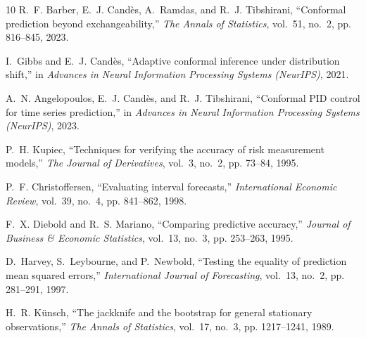 \documentclass[conference]{IEEEtran}
\begin{document}
\begin{thebibliography}{10}
R.~F. Barber, E.~J. Cand{\`e}s, A.~Ramdas, and R.~J. Tibshirani, ``Conformal
  prediction beyond exchangeability,'' \emph{The Annals of Statistics},
  vol.~51, no.~2, pp. 816--845, 2023.

I.~Gibbs and E.~J. Cand{\`e}s, ``Adaptive conformal inference under
  distribution shift,'' in \emph{Advances in Neural Information Processing
  Systems (NeurIPS)}, 2021.

A.~N. Angelopoulos, E.~J. Cand{\`e}s, and R.~J. Tibshirani, ``Conformal {PID}
  control for time series prediction,'' in \emph{Advances in Neural Information
  Processing Systems (NeurIPS)}, 2023.

P.~H. Kupiec, ``Techniques for verifying the accuracy of risk measurement
  models,'' \emph{The Journal of Derivatives}, vol.~3, no.~2, pp. 73--84, 1995.

P.~F. Christoffersen, ``Evaluating interval forecasts,'' \emph{International
  Economic Review}, vol.~39, no.~4, pp. 841--862, 1998.

F.~X. Diebold and R.~S. Mariano, ``Comparing predictive accuracy,''
  \emph{Journal of Business \& Economic Statistics}, vol.~13, no.~3, pp.
  253--263, 1995.

D.~Harvey, S.~Leybourne, and P.~Newbold, ``Testing the equality of prediction
  mean squared errors,'' \emph{International Journal of Forecasting}, vol.~13,
  no.~2, pp. 281--291, 1997.

H.~R. K{\"u}nsch, ``The jackknife and the bootstrap for general stationary
  observations,'' \emph{The Annals of Statistics}, vol.~17, no.~3, pp.
  1217--1241, 1989.

\end{thebibliography}
\end{document}
